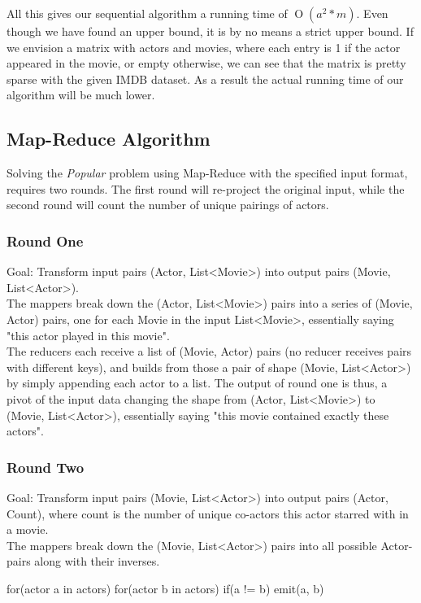 \documentclass[a4paper,11pt]{article}
\newcommand{\BigO}[1]{\ensuremath{\operatorname{O}\left(#1\right)}}
\begin{document}
All this gives our sequential algorithm a running time of \BigO{a^2*m}. Even though we have found an upper bound, it is by no means a strict upper bound. If we envision a matrix with actors and movies, where each entry is 1 if the actor appeared in the movie, or empty otherwise, we can see that the matrix is pretty sparse with the given IMDB dataset. As a result the actual running time of our algorithm will be much lower.
\subsection{Map-Reduce Algorithm}
Solving the \emph{Popular} problem using Map-Reduce with the specified input format, requires two rounds. The first round will re-project the original input, while the second round will count the number of unique pairings of actors.

\subsubsection{Round One}
Goal: Transform input pairs (Actor, List<Movie>) into output pairs (Movie, List<Actor>).\\

The mappers break down the (Actor, List<Movie>) pairs into a series of (Movie, Actor) pairs, one for each Movie in the input List<Movie>, essentially saying "this actor played in this movie".\\

The reducers each receive a list of (Movie, Actor) pairs (no reducer receives pairs with different keys), and builds from those a pair of shape (Movie, List<Actor>) by simply appending each actor to a list. The output of round one is thus, a pivot of the input data changing the shape from (Actor, List<Movie>) to (Movie, List<Actor>), essentially saying "this movie contained exactly these actors".

\subsubsection{Round Two}
Goal: Transform input pairs (Movie, List<Actor>) into output pairs (Actor, Count), where count is the number of unique co-actors this actor starred with in a movie.\\

The mappers break down the (Movie, List<Actor>) pairs into all possible Actor-pairs along with their inverses.

for(actor a in actors)
	for(actor b in actors)
		if(a != b)
			emit(a, b)
\end{document}
